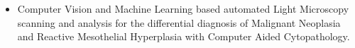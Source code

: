 \documentclass[10pt,a4paper]{altacv}
\begin{document}
\smallskip

\begin{itemize}
    \item Computer Vision and Machine Learning based automated Light Microscopy scanning and analysis for the differential diagnosis of Malignant Neoplasia and Reactive Mesothelial Hyperplasia with Computer Aided Cytopathology.
\end{itemize}
\end{document}

